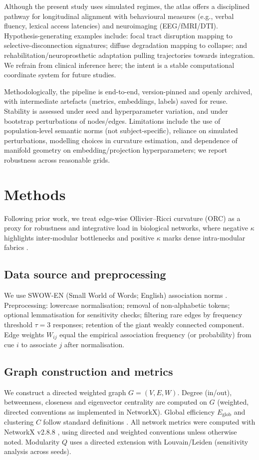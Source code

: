 \documentclass[fleqn,10pt]{wlscirep}
\begin{document}
Although the present study uses simulated regimes, the atlas offers a disciplined pathway for longitudinal alignment with behavioural measures (e.g., verbal fluency, lexical access latencies) and neuroimaging (EEG/fMRI/DTI). Hypothesis-generating examples include: focal tract disruption mapping to selective-disconnection signatures; diffuse degradation mapping to collapse; and rehabilitation/neuroprosthetic adaptation pulling trajectories towards integration. We refrain from clinical inference here; the intent is a stable computational coordinate system for future studies.

Methodologically, the pipeline is end-to-end, version-pinned and openly archived, with intermediate artefacts (metrics, embeddings, labels) saved for reuse. Stability is assessed under seed and hyperparameter variation, and under bootstrap perturbations of nodes/edges. Limitations include the use of population-level semantic norms (not subject-specific), reliance on simulated perturbations, modelling choices in curvature estimation, and dependence of manifold geometry on embedding/projection hyperparameters; we report robustness across reasonable grids.

\section*{Methods}
Following prior work, we treat edge-wise Ollivier--Ricci curvature (ORC) as a proxy for robustness and integrative load in biological networks, where negative $\kappa$ highlights inter-modular bottlenecks and positive $\kappa$ marks dense intra-modular fabrics \citep{Farooq2019NatComm,Sia2019SciRep}.


\subsection*{Data source and preprocessing}
We use SWOW-EN (Small World of Words; English) association norms \cite{DeDeyne2019}. Preprocessing: lowercase normalisation; removal of non-alphabetic tokens; optional lemmatisation for sensitivity checks; filtering rare edges by frequency threshold $\tau=3$ responses; retention of the giant weakly connected component. Edge weights $W_{ij}$ equal the empirical association frequency (or probability) from cue $i$ to associate $j$ after normalisation.

\subsection*{Graph construction and metrics}
We construct a directed weighted graph $G=(V,E,W)$. Degree (in/out), betweenness, closeness and eigenvector centrality are computed on $G$ (weighted, directed conventions as implemented in NetworkX). Global efficiency $E_{\mathrm{glob}}$ and clustering $C$ follow standard definitions \cite{Newman2010Networks,Latora2001PRL}. All network metrics were computed with NetworkX v2.8.8 \cite{NetworkX}, using directed and weighted conventions unless otherwise noted. Modularity $Q$ uses a directed extension with Louvain/Leiden (sensitivity analysis across seeds).
\end{document}
